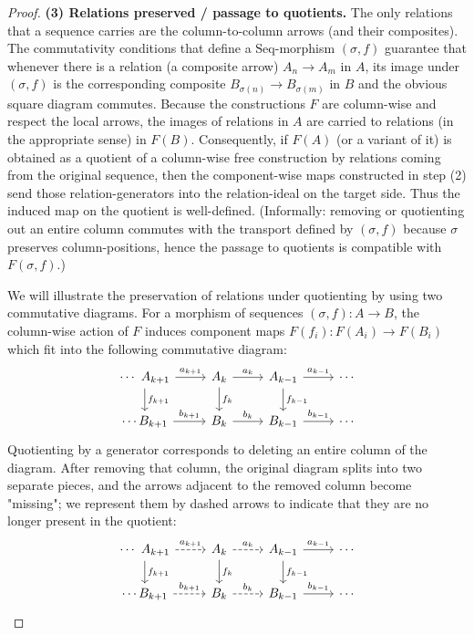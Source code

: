 \documentclass[11pt]{book}
\theoremstyle{definition}
\theoremstyle{plain}
\theoremstyle{remark}
\begin{document}
\begin{proof}
\vspace{6pt}\noindent\textbf{(3) Relations preserved / passage to quotients.}
The only relations that a sequence carries are the column-to-column arrows
(and their composites).  The commutativity conditions that define a \(\mathrm{Seq}\)-morphism
\((\sigma,f)\) guarantee that whenever there is a relation (a composite arrow)
\(A_n\to A_m\) in \(A\), its image under \((\sigma,f)\) is the corresponding
composite \(B_{\sigma(n)}\to B_{\sigma(m)}\) in \(B\) and the obvious square
diagram commutes.  Because the constructions \(F\) are column-wise and respect
the local arrows, the images of relations in \(A\) are carried to relations
(in the appropriate sense) in \(F(B)\).  Consequently, if \(F(A)\) (or a
variant of it) is obtained as a quotient of a column-wise free construction by
relations coming from the original sequence, then the component-wise maps
constructed in step (2) send those relation-generators into the relation-ideal
on the target side.  Thus the induced map on the quotient is well-defined.
(Informally: removing or quotienting out an entire column commutes with the
transport defined by \((\sigma,f)\) because \(\sigma\) preserves column-positions,
hence the passage to quotients is compatible with \(F(\sigma,f)\).)

We will illustrate the preservation of relations under quotienting by using two
commutative diagrams.  
For a morphism of sequences \((\sigma,f):A\to B\), the column-wise action of
\(F\) induces component maps \(F(f_i):F(A_i)\to F(B_i)\) which fit into the
following commutative diagram:
\[
\begin{tikzcd}
  \cdots \
  A_{k+1} \ar[r,"a_{k+1}"] \ar[d,"f_{k+1}"] &
  A_k  \ar[r,"a_k"] \ar[d,"f_{k}"] &
  A_{k-1} \ar[r,"a_{k-1}"] \ar[d,"f_{k-1}"]  &
  \cdots \\ 
  \cdots
  B_{k+1} \ar[r,"b_{k+1}"] &
  B_k \ar[r,"b_k"] &
  B_{k-1} \ar[r,"b_{k-1}"] &
  \cdots
\end{tikzcd}
\]
Quotienting by a generator corresponds to deleting an entire column of the
diagram.  After removing that column, the original diagram splits into two
separate pieces, and the arrows adjacent to the removed column become
"missing"; we represent them by dashed arrows to indicate that they are no
longer present in the quotient:
\[
\begin{tikzcd}
  \cdots \
  A_{k+1} \ar[r,dashed,"a_{k+1}"] \ar[d,"f_{k+1}"] &
  A_k  \ar[r,dashed,"a_k"] \ar[d,"f_{k}"] &
  A_{k-1} \ar[r,"a_{k-1}"] \ar[d,"f_{k-1}"]  &
  \cdots \\ 
  \cdots
  B_{k+1} \ar[r,dashed,"b_{k+1}"] &
  B_k \ar[r,dashed,"b_k"] &
  B_{k-1} \ar[r,"b_{k-1}"] &
  \cdots
\end{tikzcd}
\]





\end{proof}
\end{document}
